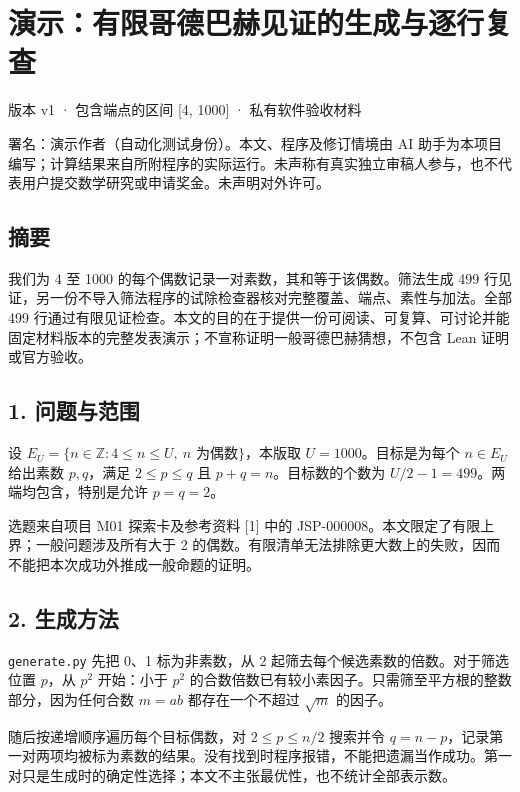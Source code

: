 \documentclass[
  11pt,
  fontset=fandol]{ctexart}
\author{}
\date{}
\begin{document}
\section{演示：有限哥德巴赫见证的生成与逐行复查}\label{ux6f14ux793aux6709ux9650ux54e5ux5fb7ux5df4ux8d6bux89c1ux8bc1ux7684ux751fux6210ux4e0eux9010ux884cux590dux67e5}

版本 v1 · 包含端点的区间 {[}4, 1000{]} · 私有软件验收材料

署名：演示作者（自动化测试身份）。本文、程序及修订情境由 AI
助手为本项目编写；计算结果来自所附程序的实际运行。未声称有真实独立审稿人参与，也不代表用户提交数学研究或申请奖金。未声明对外许可。

\subsection{摘要}\label{ux6458ux8981}

我们为 4 至 1000 的每个偶数记录一对素数，其和等于该偶数。筛法生成 499
行见证，另一份不导入筛法程序的试除检查器核对完整覆盖、端点、素性与加法。全部
499
行通过有限见证检查。本文的目的在于提供一份可阅读、可复算、可讨论并能固定材料版本的完整发表演示；不宣称证明一般哥德巴赫猜想，不包含
Lean 证明或官方验收。

\subsection{1. 问题与范围}\label{ux95eeux9898ux4e0eux8303ux56f4}

设 \(E_U=\{n\in\mathbb{Z}:4\leq n\leq U,\ n\text{ 为偶数}\}\)，本版取
\(U=1000\)。目标是为每个 \(n\in E_U\) 给出素数 \(p,q\)，满足
\(2\leq p\leq q\) 且 \(p+q=n\)。目标数的个数为
\(U/2-1=499\)。两端均包含，特别是允许 \(p=q=2\)。

选题来自项目 M01 探索卡及参考资料 {[}1{]} 中的
JSP-000008。本文限定了有限上界；一般问题涉及所有大于 2
的偶数。有限清单无法排除更大数上的失败，因而不能把本次成功外推成一般命题的证明。

\subsection{2. 生成方法}\label{ux751fux6210ux65b9ux6cd5}

\texttt{generate.py} 先把 0、1 标为非素数，从 2
起筛去每个候选素数的倍数。对于筛选位置 \(p\)，从 \(p^2\) 开始：小于
\(p^2\) 的合数倍数已有较小素因子。只需筛至平方根的整数部分，因为任何合数
\(m=ab\) 都存在一个不超过 \(\sqrt{m}\) 的因子。

随后按递增顺序遍历每个目标偶数，对 \(2\leq p\leq n/2\) 搜索并令
\(q=n-p\)，记录第一对两项均被标为素数的结果。没有找到时程序报错，不能把遗漏当作成功。第一对只是生成时的确定性选择；本文不主张最优性，也不统计全部表示数。
\end{document}
